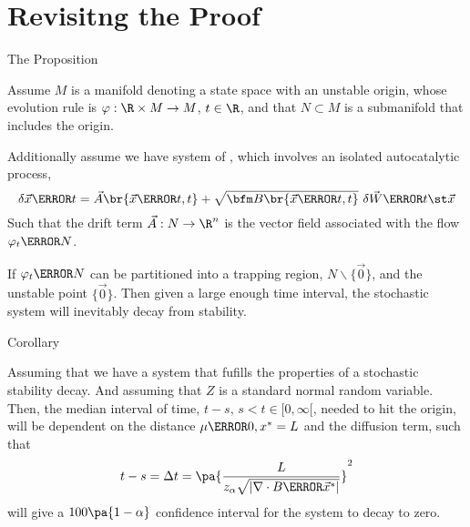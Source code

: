 \documentclass[aspectratio=169,  notheorems, sOuRcEs]{RUCPresentation}
\begin{document}
\section{Revisitng the Proof}
\begin{frame}{The Proposition}

    \begin{proposition}[name={Stochastic Stability Decay}] \label{prp.ssd}

        Assume \(M\) is a manifold denoting a state space with an unstable origin,
        whose {evolution rule} is \(\varphi:\R\times M\to M\),
        \(t\in\R\), and that \(N\subset M\) is a submanifold that includes the origin.

        Additionally assume we have system of ,
        which involves an isolated autocatalytic process,
        \begin{equation*}
            \delta \vec{x}\of t
            = \vec{A}\br{\vec{x}\of t, t}
            + \sqrt{\bfm B\br{\vec{x}\of t, t}} \ \delta{\vec{W}\of{t\st \vec{x}}}
        \end{equation*}
        Such that the drift term \(\vec{A}:N\to\R^n\) is the vector field
        associated with the flow \(\varphi_t\of N\).

        If \(\varphi_t\of{N}\) can be partitioned into a trapping region,
        \(N\backslash\{\vec{0}\}\), and the unstable point \(\{\vec{0}\}\).
        Then given a large enough time interval,
        the stochastic system will inevitably decay from stability.

    \end{proposition}

\end{frame}

\begin{frame}{Corollary}

    \begin{corollary} \label{con:timetodestable}


        Assuming that we have a system that fufills the properties of a stochastic
        stability decay.
        And assuming that \(Z\) is a standard normal random variable.
        Then, the median interval of time, \(t-s\), \(s<t\in[0,\infty[\),
        needed to hit the origin, will be dependent on the distance
        \(\mu\of{0, x^*}= L\) and the diffusion term, such that
        \begin{equation}
            t-s = \Delta t = \pa{{L \over z_\alpha \sqrt{|\nabla \cdot {B}\of{\vec{x}^*}|}}}^2
        \end{equation}
        will give a \(100\pa{1-\alpha}\) confidence interval for the
        system to decay to zero.

    \end{corollary}

\end{frame}
\end{document}
